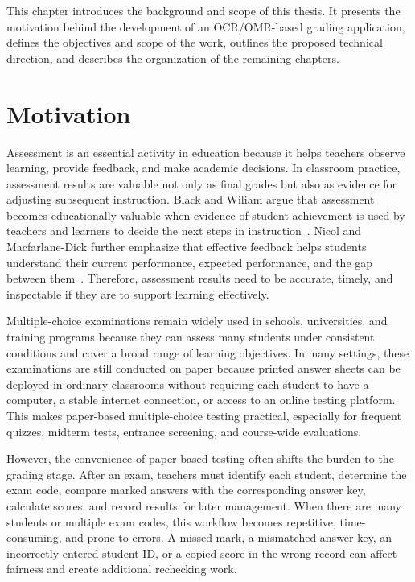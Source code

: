 \documentclass[../Main.tex]{subfiles}
\begin{document}
This chapter introduces the background and scope of this thesis. It presents the
motivation behind the development of an OCR/OMR-based grading application,
defines the objectives and scope of the work, outlines the proposed technical
direction, and describes the organization of the remaining chapters.

\section{Motivation}
\label{section:1.1}
Assessment is an essential activity in education because it helps teachers observe learning, provide feedback, and make academic decisions. In classroom practice, assessment results are valuable not only as final grades but also as evidence for adjusting subsequent instruction. Black and Wiliam argue that assessment becomes educationally valuable when evidence of student achievement is used by teachers and learners to decide the next steps in instruction~\cite{black1998assessment}. Nicol and Macfarlane-Dick further emphasize that effective feedback helps students understand their current performance, expected performance, and the gap between them~\cite{nicol2006formative}. Therefore, assessment results need to be accurate, timely, and inspectable if they are to support learning effectively.

Multiple-choice examinations remain widely used in schools, universities, and training programs because they can assess many students under consistent conditions and cover a broad range of learning objectives. In many settings, these examinations are still conducted on paper because printed answer sheets can be deployed in ordinary classrooms without requiring each student to have a computer, a stable internet connection, or access to an online testing platform. This makes paper-based multiple-choice testing practical, especially for frequent quizzes, midterm tests, entrance screening, and course-wide evaluations.

However, the convenience of paper-based testing often shifts the burden to the grading stage. After an exam, teachers must identify each student, determine the exam code, compare marked answers with the corresponding answer key, calculate scores, and record results for later management. When there are many students or multiple exam codes, this workflow becomes repetitive, time-consuming, and prone to errors. A missed mark, a mismatched answer key, an incorrectly entered student ID, or a copied score in the wrong record can affect fairness and create additional rechecking work.
\end{document}
